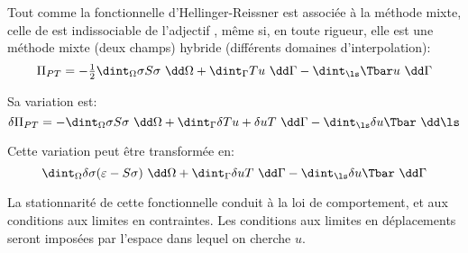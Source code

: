 \medskip
Tout comme la fonctionnelle d'Hellinger-Reissner est associée à
la méthode mixte, celle de 
 est indissociable
de l'adjectif , même si, en toute rigueur, elle est
une méthode mixte (deux champs) hybride (différents domaines
d'interpolation):
\begin{equation}
   \label{Eq:PiPT}
   \Pi_{PT} = -\tfrac12\dint_\Omega \sigma S\sigma\ \dd\Omega
         +\dint_{\Gamma} T u\ \dd\Gamma\\
         -\dint_{\ls} \Tbar u\ \dd\Gamma
\end{equation}

\medskip
Sa variation est:
\begin{equation}
   \label{Eq:deltaPiPT}
   \delta\Pi_{PT} =
        -\dint_{\Omega} \sigma S\sigma\ \dd\Omega
        +\dint_{\Gamma} \delta Tu+\delta uT\ \dd\Gamma
        -\dint_{\ls} \delta u \Tbar\ \dd\ls
\end{equation}

\medskip
Cette variation peut être transformée en:
\[
   \dint_\Omega \delta \sigma (\varepsilon- S\sigma) \ \dd\Omega
   +\dint_{\Gamma} \delta uT\ \dd\Gamma
   -\dint_{\ls} \delta u\Tbar\ \dd\Gamma
\]

\medskip
La stationnarité de cette fonctionnelle conduit à la loi de
comportement, et aux conditions aux limites en contraintes.
Les conditions aux limites en déplacements seront imposées par l'espace
dans lequel on cherche $u$.

